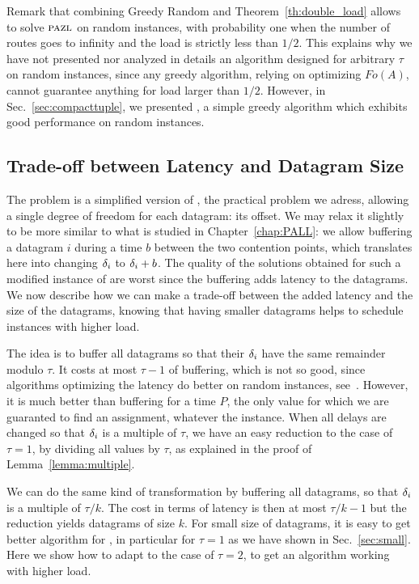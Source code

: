 Remark that combining Greedy Random and Theorem~\ref{th:double_load} allows to solve $\textsc{pazl}$ on random instances,
with probability one when the number of routes goes to infinity and the load is strictly less than $1/2$. 
This explains why we have not presented nor analyzed in details an algorithm designed for arbitrary $\tau$ on random instances, since any greedy algorithm, relying on optimizing $Fo(A)$, cannot guarantee anything for load larger than $1/2$.
However, in Sec.~\ref{sec:compacttuple}, we presented \compactfit, a simple greedy algorithm which exhibits good performance on random instances.

\subsection{Trade-off between Latency and Datagram Size}

The problem \pma is a simplified version of \pall, the practical problem we adress, allowing a single degree of freedom for each datagram: its offset. We may relax it slightly to be more similar to what is studied in Chapter~\ref{chap:PALL}: we allow buffering a datagram $i$ during a time $b$ between the two contention points, which translates here into changing $\delta_i$ to $\delta_i + b$. The quality of the solutions obtained for such a modified instance of \pma are worst since the buffering adds latency to the datagrams. We now describe how we can make a trade-off between the added latency and the size of the datagrams, knowing that having smaller datagrams helps to schedule instances with higher load.


The idea is to buffer all datagrams so that their $\delta_i$ have the same
remainder modulo $\tau$. It costs at most $\tau - 1$ of buffering, which is not
so good, since algorithms optimizing the latency do better on random instances, see~\cite{barth2018deterministic}. However, it is much better than buffering for a time $P$, the only value for which we are guaranted to find an assignment, whatever the instance. When all delays are changed so that $\delta_i$ is a multiple of $\tau$, we have an easy reduction to the case of $\tau = 1$, by dividing all values by $\tau$, as explained in the proof of Lemma~\ref{lemma:multiple}.


We can do the same kind of transformation by buffering all datagrams, so that $\delta_i$ is a multiple of $\tau / k$. The cost in terms of latency is then at most $\tau / k - 1$ but the reduction yields datagrams of size $k$.
For small size of datagrams, it is easy to get better algorithm for \pma, in particular for $\tau = 1$ as we have shown in Sec.~\ref{sec:small}. Here we show how to adapt \compactpair to the case of $\tau = 2$, to get an algorithm working with higher load.



